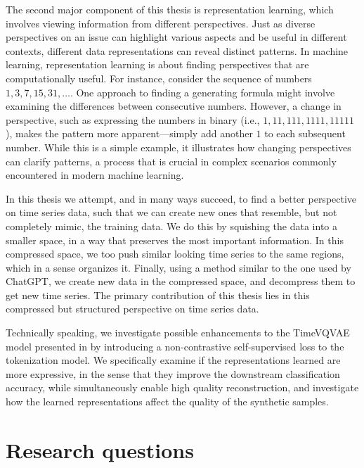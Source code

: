 \documentclass[../../thesis.tex]{subfiles}
\begin{document}
The second major component of this thesis is representation learning, which involves viewing information from different perspectives. Just as diverse perspectives on an issue can highlight various aspects and be useful in different contexts, different data representations can reveal distinct patterns. In machine learning, representation learning is about finding perspectives that are computationally useful. For instance, consider the sequence of numbers $1, 3, 7, 15, 31, \dots$. One approach to finding a generating formula might involve examining the differences between consecutive numbers. However, a change in perspective, such as expressing the numbers in binary (i.e., $1, 11, 111, 1111, 11111$), makes the pattern more apparent—simply add another $1$ to each subsequent number. While this is a simple example, it illustrates how changing perspectives can clarify patterns, a process that is crucial in complex scenarios commonly encountered in modern machine learning.\newline

In this thesis we attempt, and in many ways succeed, to find a better perspective on time series data, such that we can create new ones that resemble, but not completely mimic, the training data. We do this by squishing the data into a smaller space, in a way that preserves the most important information. In this compressed space, we too push similar looking time series to the same regions, which in a sense organizes it. Finally, using a method similar to the one used by ChatGPT, we create new data in the compressed space, and decompress them to get new time series. The primary contribution of this thesis lies in this compressed but structured perspective on time series data.
\newline

Technically speaking, we investigate possible enhancements to the TimeVQVAE model presented in \cite{TimeVQVAE} by introducing a non-contrastive self-supervised loss to the tokenization model. We specifically examine if the representations learned are more expressive, in the sense that they improve the downstream classification accuracy, while simultaneously enable high quality reconstruction, and investigate how the learned representations affect the quality of the synthetic samples. 


\section{Research questions}
\end{document}
